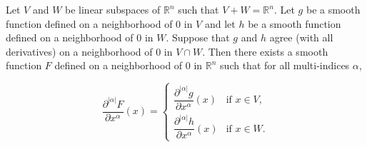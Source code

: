 Let $V$ and $W$ be linear subspaces of $\mathbb{R}^n$ such that $V + W = \mathbb{R}^n$. Let $g$ be a smooth function defined on a neighborhood of $0$ in $V$ and let $h$ be a smooth function defined on a neighborhood of $0$ in $W$. Suppose that $g$ and $h$ agree (with all derivatives) on a neighborhood of $0$ in $V \cap W$. Then there exists a smooth function $F$ defined on a neighborhood of $0$ in $\mathbb{R}^n$ such that for all multi-indices $\alpha$,

$$\frac{\partial^{|\alpha|}F}{\partial x^\alpha}(x) = \begin{cases}
\dfrac{\partial^{|\alpha|}g}{\partial x^\alpha}(x) & \text{if } x \in V,\\[10pt]
\dfrac{\partial^{|\alpha|}h}{\partial x^\alpha}(x) & \text{if } x \in W.
\end{cases}$$
